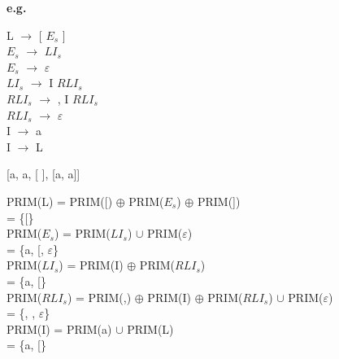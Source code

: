 \documentclass[\main/ApuntesPL.tex]{subfiles}
\begin{document}
    \bigskip
    \par
    \textbf{e.g.}
    \begin{center}
      \begin{minipage}{.25\textwidth}
        L $\rightarrow$ [ $E_s$ ]\\
        $E_s$ $\rightarrow$ $LI_s$\\
        $E_s$ $\rightarrow$ $\varepsilon$\\
        $LI_s$ $\rightarrow$ I $RLI_s$\\
        $RLI_s$ $\rightarrow$ , I $RLI_s$\\
        $RLI_s$ $\rightarrow$ $\varepsilon$\\
        I $\rightarrow$ a\\
        I $\rightarrow$ L\\
        \vspace*{2mm}

        [a, a, [ ], [a, a]]
      \end{minipage}%
      \begin{minipage}{.75\textwidth}
        PRIM(L) = PRIM([) $\oplus$ PRIM($E_s$) $\oplus$ PRIM(])\\
        \hspace*{17mm}= \{[\}\\
        PRIM($E_s$) = PRIM($LI_s$) $\cup$ PRIM($\varepsilon$)\\
        \hspace*{19mm}= \{a, [, $\varepsilon$\}\\
        PRIM($LI_s$) = PRIM(I) $\oplus$ PRIM($RLI_s$)\\
        \hspace*{20.5mm}= \{a, [\}\\
        PRIM($RLI_s$) = PRIM(,) $\oplus$ PRIM(I) $\oplus$ PRIM($RLI_s$) $\cup$ PRIM($\varepsilon$)\\
        \hspace*{23.5mm}= \{{\LARGE ,} , $\varepsilon$\}\\
        PRIM(I) = PRIM(a) $\cup$ PRIM(L)\\
        \hspace*{16mm}= \{a, [\}\\
      \end{minipage}


\end{center}
\end{document}

